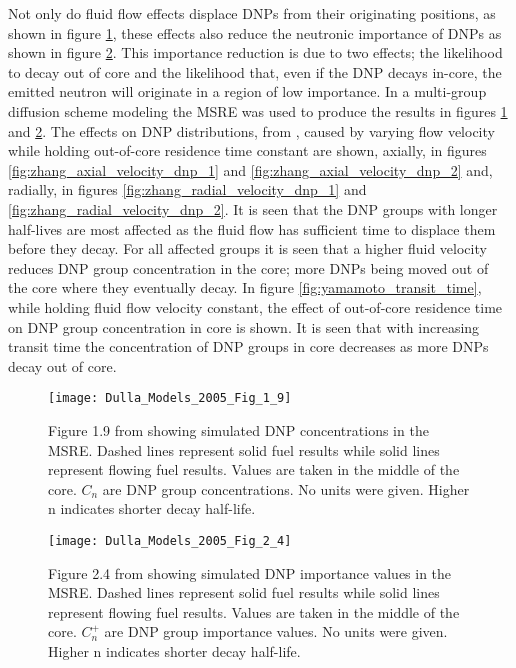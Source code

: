 \documentclass[review]{elsarticle}
\begin{document}
\par Not only do fluid flow effects displace DNPs from their originating positions,
as shown in figure \ref{fig:dulla_msre_dnp_displacement}, these effects also
reduce the neutronic importance of DNPs as shown in figure
\ref{fig:dulla_msre_dnp_importance}. This importance reduction is due to two
effects; the likelihood to decay out of core and the likelihood that, even if the
DNP decays in-core, the emitted neutron will originate in a region of low
importance. In \cite{dulla_models_2005} a multi-group
diffusion scheme modeling the MSRE was used to produce the results in figures
\ref{fig:dulla_msre_dnp_displacement} and \ref{fig:dulla_msre_dnp_importance}.
The effects on DNP distributions, from \cite{zhang_development_2009-1}, caused
by varying flow velocity while holding out-of-core residence time constant are
shown, axially, in figures \ref{fig:zhang_axial_velocity_dnp_1} and 
\ref{fig:zhang_axial_velocity_dnp_2} and, radially, in figures
\ref{fig:zhang_radial_velocity_dnp_1} and \ref{fig:zhang_radial_velocity_dnp_2}.
It is seen that the DNP groups with longer half-lives are most affected as the
fluid flow has sufficient time to displace them before they decay. For all
affected groups it is seen that a higher fluid velocity reduces DNP group
concentration in the core; more DNPs being moved out of the core where they
eventually decay. In figure \ref{fig:yamamoto_transit_time}, while holding fluid flow velocity constant, the effect of
out-of-core residence time on DNP group concentration
in core is shown. It is seen that with increasing transit time the concentration
of DNP groups in core decreases as more DNPs decay out of core.   

\begin{figure}[h]
   \centering
   \texttt{[image: Dulla\_Models\_2005\_Fig\_1\_9]}
   \caption{Figure 1.9 from \cite{dulla_models_2005} showing simulated DNP concentrations in the
    MSRE. Dashed lines represent
    solid fuel results while solid lines represent flowing fuel results. Values
    are taken in the middle of the core. $C_{n}$ are DNP group concentrations. No
    units were given. Higher n indicates shorter decay half-life.}
   \label{fig:dulla_msre_dnp_displacement}
\end{figure}

\begin{figure}[h]
   \centering
   \texttt{[image: Dulla\_Models\_2005\_Fig\_2\_4]}
   \caption{Figure 2.4 from \cite{dulla_models_2005} showing simulated DNP importance values in the
    MSRE. Dashed lines represent
    solid fuel results while solid lines represent flowing fuel results. Values
    are taken in the middle of the core. $C_{n}^{+}$ are DNP group importance values. 
    No units were given. Higher n indicates shorter decay half-life.}
   \label{fig:dulla_msre_dnp_importance}
\end{figure}
\end{document}
